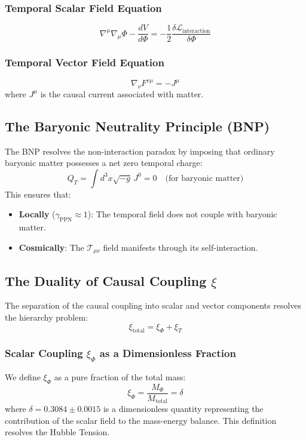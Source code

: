\documentclass[12pt,a4paper]{article}
\begin{document}
\subsubsection{Temporal Scalar Field Equation}
\begin{equation}
    \nabla^\mu \nabla_\mu \Phi - \frac{dV}{d\Phi} = -\frac{1}{2} \frac{\delta\mathcal{L}_{\text{interaction}}}{\delta \Phi}
\end{equation}

\subsubsection{Temporal Vector Field Equation}
\begin{equation}
    \nabla_\nu F^{\nu\mu} = -J^\mu
\end{equation}
where $J^\mu$ is the causal current associated with matter.

\subsection{The Baryonic Neutrality Principle (BNP)}
The BNP resolves the non-interaction paradox by imposing that ordinary baryonic matter possesses a net zero temporal charge:
\begin{equation}
    Q_T = \int d^3x \sqrt{-g} \, J^0 = 0 \quad \text{(for baryonic matter)}
\end{equation}
This ensures that:
\begin{itemize}
    \item \textbf{Locally} ($\gamma_{\text{PPN}} \approx 1$): The temporal field does not couple with baryonic matter.
    \item \textbf{Cosmically}: The $\mathcal{T}_{\mu\nu}$ field manifests through its self-interaction.
\end{itemize}

\subsection{The Duality of Causal Coupling \texorpdfstring{$\xi$}{xi}}

The separation of the causal coupling into scalar and vector components resolves the hierarchy problem:
\begin{equation}
    \xi_{\text{total}} = \xi_\Phi + \xi_T
\end{equation}

\subsubsection{Scalar Coupling \texorpdfstring{$\xi_\Phi$}{xi\_Phi} as a Dimensionless Fraction}
We define $\xi_\Phi$ as a pure fraction of the total mass:
\begin{equation}
    \xi_\Phi = \frac{M_\Phi}{M_{\text{total}}} = \delta
\end{equation}
where $\delta = 0.3084 \pm 0.0015$ is a dimensionless quantity representing the contribution of the scalar field to the mass-energy balance. This definition resolves the Hubble Tension.
\end{document}
